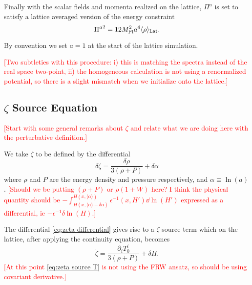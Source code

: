 Finally with the scalar fields and momenta realized on the lattice, $\Pi^a$ is set to satisfy a lattice averaged version of the energy constraint
\begin{equation} \label{eq:energy constraint}
  {\Pi^a}^2 = 12M_{\mathrm{Pl}}^2a^4\langle \rho \rangle_{\mathrm{Lat}}.
\end{equation}

By convention we set $a=1$ at the start of the lattice simulation.

\textcolor{red}{[Two subtleties with this procedure: i) this is matching the spectra instead of the real space two-point, ii) the homogeneous calculation is not using a renormalized potential, so there is a slight mismatch when we initialize onto the lattice.]}

\subsection{$\zeta$ Source Equation} \label{sec:zeta source}
\textcolor{red}{[Start with some general remarks about $\zeta$ and relate what we are doing here with the perturbative definition.]}



We take $\zeta$ to be defined by the differential
\begin{equation} \label{eq:zeta differential}
  \delta\zeta = \frac{\delta\rho}{3(\rho + P)} + \delta\alpha
\end{equation}
where $\rho$ and $P$ are the energy density and pressure respectively, and $\alpha \equiv \ln(a)$.
\textcolor{red}{[Should we be putting $(\rho+P)$ or $\rho(1+W)$ here? I think the physical quantity should be $-\int_{H(x,\langle\alpha\rangle-\delta\alpha)}^{H(x,\langle\alpha\rangle)}\epsilon^{-1}(x,H')\dd\ln(H')$ expressed as a differential, ie $-\epsilon^{-1}\delta\ln(H)$.]}

The differential \eqref{eq:zeta differential} gives rise to a $\zeta$ source term which on the lattice, after applying the continuity equation, becomes
\begin{equation} \label{eq:zeta source T}
  \dot{\zeta} = \frac{\partial_iT^i_0}{3(\rho+P)} + \delta H. %
\end{equation}
\textcolor{red}{[At this point \eqref{eq:zeta source T} is not using the FRW ansatz, so should be using covariant derivative.]}

